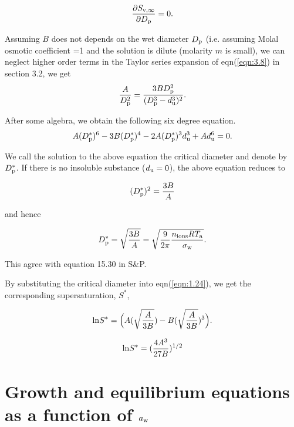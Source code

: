 \documentclass[12pt]{article}
\begin{document}
\begin{equation}\label{eqn:1.25}
\frac{\partial S_{\rm v, \infty}}{\partial D_{\rm p}}=0.
\end{equation}

Assuming $B$ does not depends on the wet diameter $D_{\rm p}$ (i.e. assuming Molal osmotic coefficient =1 and the solution is dilute (molarity $m$ is small), we can neglect higher order terms in the Taylor series expansion of eqn(\ref{eqn:3.8}) in section 3.2,  we get
\begin{equation}\label{eqn:1.26}
\frac{A}{D_{\rm p}^{2}}=\frac{3 B D_{\rm p}^{2}}{(D_{\rm p}^{3}- d_{\rm u}^{3})^{2}}.
\end{equation} 

After some algebra, we obtain the following six degree equation.
\begin{equation}\label{eqn:1.27}
A(D_{\rm p}^{*})^{6}-3B(D_{\rm p}^{*})^{4}-2 A(D_{\rm p}^{*})^{3} d_{\rm u}^{3}+ A d_{\rm u}^{6}=0.
\end{equation}

We call the solution to the above equation the critical diameter and denote by $D_{\rm p}^{*}$. If there is no insoluble substance ($d_{\rm u}=0$), the above equation reduces to 

\begin{equation}\label{eqn:1.28}
(D_{\rm p}^{*})^{2}=\frac{3B}{A} 
\end{equation}

and hence 

\begin{equation}\label{eqn:1.29}
D_{\rm p}^{*}=\sqrt{\frac{3B}{A}}= \sqrt {\frac{9}{2 \pi} \frac{n_{\rm ions} RT_{\rm a}}{\sigma_{\rm w}}}.
\end{equation}

This agree with equation 15.30 in S$\&$P.

By substituting the critical diameter into eqn(\ref{eqn:1.24}), we get the corresponding supersaturation, $S^{*}$,

\begin{equation}\label{eqn:1.30}
{\rm ln} S^{*} = \Big(A (\sqrt{\frac{A}{3B}})   -   B (\sqrt{\frac{A}{3B}}) ^{3} \Big).
\end{equation}


\begin{equation}\label{eqn:1.31}
{\rm ln}  S^{*}=(\frac{4A^{3}}{27B})^{1/2}
\end{equation}


\section{Growth and equilibrium equations as a function of $a_{\rm w}$} 
\end{document}
